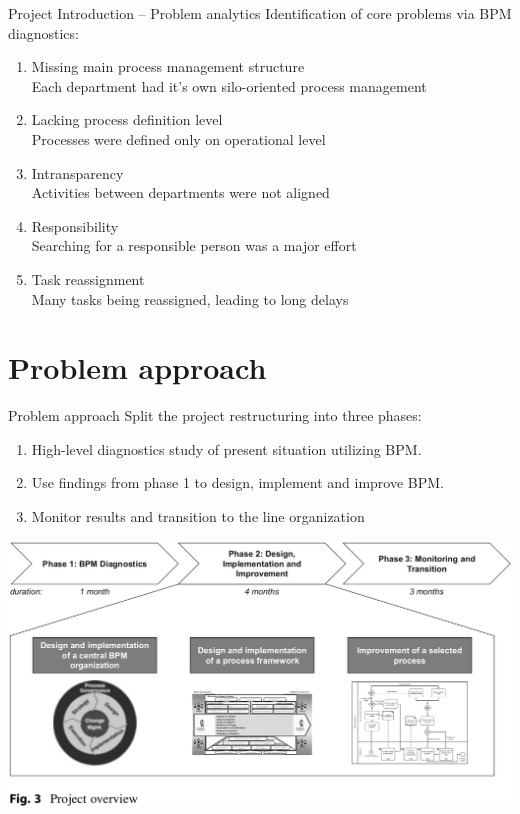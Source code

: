 \documentclass{beamer}
\begin{document}
\begin{frame}{Project Introduction -- Problem analytics}
    Identification of core problems via BPM diagnostics:
    \begin{enumerate}[$\circ$]
        \item Missing main process management structure\\Each department had it's own silo-oriented process management
        \item Lacking process definition level\\Processes were defined only on operational level
        \item Intransparency\\Activities between departments were not aligned
        \item Responsibility\\Searching for a responsible person was a major effort
        \item Task reassignment\\Many tasks being reassigned, leading to long delays
    \end{enumerate}    
\end{frame}

\section{Problem approach}
\begin{frame}{Problem approach}
    Split the project restructuring into three phases:
    \begin{enumerate}
        \item High-level diagnostics study of present situation utilizing BPM.
        \item Use findings from phase 1 to design, implement and improve BPM.
        \item Monitor results and transition to the line organization
    \end{enumerate}
\end{frame}

\begin{frame}
    \begin{center}
        \includegraphics[width=1.0\textwidth]{proj_restructuring.png}
    \end{center}
\end{frame}
\end{document}
